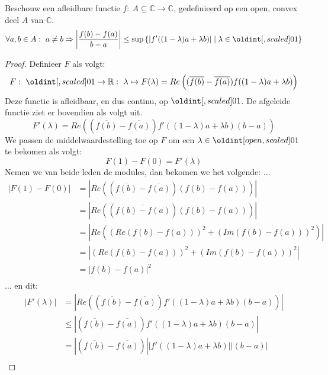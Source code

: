 \documentclass[main.tex]{subfiles}
\begin{document}
\begin{bpr}
  \label{pr:lagrange-achtig-in-c}
  Beschouw een afleidbare functie $f:\ A \subseteq \mathbb{C} \rightarrow \mathbb{C}$, gedefinieerd op een open, convex deel $A$ van $\mathbb{C}$.
  \[ \forall a,b \in A:\ a \neq b \Rightarrow \left|\frac{f(b)-f(a)}{b-a}\right| \le \sup\left\{ \left|f'((1-\lambda)a+\lambda b)\right| \mid \lambda \in \interval{0}{1} \right\} \]

  \begin{proof}
    Definieer $F$ als volgt:
    \[ F:\ \interval{0}{1} \rightarrow \mathbb{R}:\ \lambda \mapsto F(\lambda) = Re\left((\overline{f(b)}-\overline{f(a)})f((1-\lambda)a+\lambda b)\right) \]
    Deze functie is afleidbaar, en dus continu\needed, op $\interval{0}{1}$.\waarom
    De afgeleide functie ziet er bovendien als volgt uit.
    \[ F'(\lambda) = Re\left( (\overline{f(b)}-\overline{f(a)})f'((1-\lambda)a+\lambda b)(b-a)\right) \]
    We passen de middelwaardestelling toe op $F$ om een $\lambda \in \interval[open]{0}{1}$ te bekomen als volgt:
    \[ F(1)-F(0) = F'(\lambda) \]
    Nemen we van beide leden de modules, dan bekomen we het volgende: ... 
    \[
    \begin{array}{rl}
      \left| F(1)-F(0) \right|
      &= \left| Re\left((\overline{f(b)}-\overline{f(a)})(f(b)-f(a))\right) \right|\\
      &= \left| Re\left((\overline{f(b)-f(a)})(f(b)-f(a))\right) \right|\\
      &= \left| Re\left( \left(Re(f(b)-f(a))\right)^{2} + \left( Im(f(b)-f(a))\right)^{2} \right) \right|\\
      &= \left| \left(Re(f(b)-f(a))\right)^{2} + \left( Im(f(b)-f(a))\right)^{2} \right|\\
      &= \left| f(b)-f(a) \right|^{2}\\
    \end{array}
    \]
    ... en dit:
    \[ 
    \begin{array}{rl}
      \left|F'(\lambda)\right|
      &= \left| Re\left( (\overline{f(b)}-\overline{f(a)})f'((1-\lambda)a+\lambda b)(b-a)\right) \right|\\
      &\le \left| (\overline{f(b)}-\overline{f(a)})f'((1-\lambda)a+\lambda b)(b-a) \right|\\
      &= \left| (\overline{f(b)}-\overline{f(a)})\right|\left|f'((1-\lambda)a+\lambda b)\right|\left|(b-a) \right|\\

\end{array}\]
\end{proof}
\end{bpr}
\end{document}
